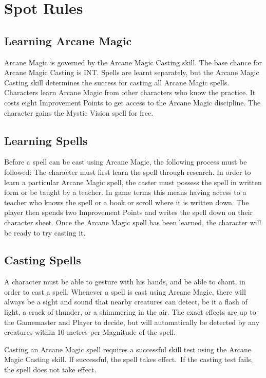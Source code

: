 \section{Spot Rules}

\subsection{Learning Arcane Magic}
Arcane Magic is governed by the Arcane Magic Casting skill. The base chance for Arcane Magic Casting is INT. Spells are learnt separately, but the Arcane Magic Casting skill determines the success for casting all Arcane Magic spells. Characters learn Arcane Magic from other characters who know the practice. It costs eight Improvement Points to get access to the Arcane Magic discipline. The character gains the Mystic Vision spell for free.

\subsection{Learning Spells}
Before a spell can be cast using Arcane Magic, the following process must be followed:
The character must first learn the spell through research. In order to learn a particular Arcane Magic spell, the caster must possess the spell in written form or be taught by a teacher. In game terms this means having access to a teacher who knows the spell or a book or scroll where it is written down. The player then spends two Improvement Points and writes the spell down on their character sheet. Once the Arcane Magic spell has been learned, the character will be ready to try casting it.



\subsection{Casting Spells}
A character must be able to gesture with his hands, and be able to chant, in order to cast a spell. Whenever a spell is cast using Arcane Magic, there will always be a sight and sound that nearby creatures can detect, be it a flash of light, a crack of thunder, or a shimmering in the air. The exact effects are up to the Gamemaster and Player to decide, but will automatically be detected by any creatures within 10 metres per Magnitude of the spell. 

Casting an Arcane Magic spell requires a successful skill test using the Arcane Magic Casting skill. If successful, the spell takes effect. If the casting test fails, the spell does not take effect. 

